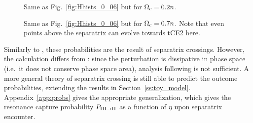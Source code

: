\documentclass[
        fleqn,
        usenatbib,
    ]{mnras}
\begin{document}
\begin{figure}
    \centering
    \caption{Same as Fig.~\ref{fig:Hhists_0_06} but for $\Omega_{\rm c} =
    0.2n$.}\label{fig:Hhists_0_20}
\end{figure}
\begin{figure}
    \centering
    \caption{Same as Fig.~\ref{fig:Hhists_0_06} but for $\Omega_{\rm c} =
    0.7n$. Note that even points above the separatrix can evolve towards tCE2
    here.}\label{fig:Hhists_0_70}
\end{figure}

Similarly to \citet{su2020}, these probabilities are the result of separatrix
crossings. However, the calculation differs from \citet{su2020}: since the
perturbation is dissipative in phase space (i.e.\ it does not conserve phase
space area), analysis following \citet{henrard1982} is not sufficient. A more
general theory of separatrix crossing is still able to predict the outcome
probabilities, extending the results in Section~\ref{ss:toy_model}.
Appendix~\ref{app:probs} gives the appropriate generalization, which gives the
resonance capture probability $P_{\rm III \to II}$ as a function of $\eta$ upon
separatrix encounter.
\end{document}
